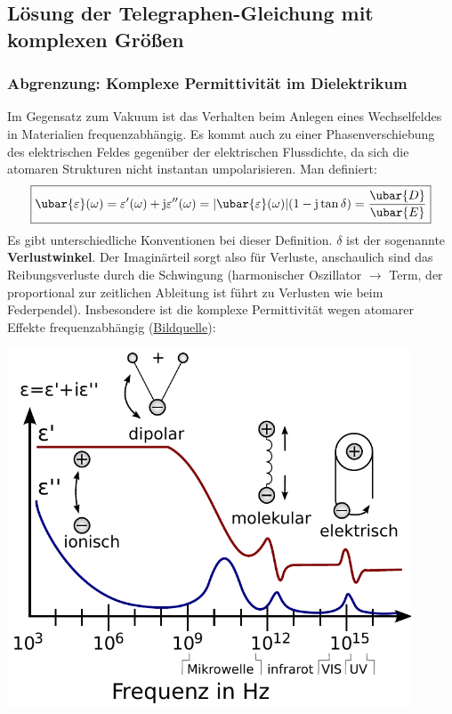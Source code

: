   \subsection{Lösung der Telegraphen-Gleichung mit komplexen Größen}
  \subsubsection{Abgrenzung: Komplexe Permittivität im Dielektrikum}
  Im Gegensatz zum Vakuum ist das Verhalten beim Anlegen eines Wechselfeldes in Materialien frequenzabhängig. Es kommt auch zu einer Phasenverschiebung des elektrischen Feldes gegenüber der elektrischen Flussdichte, da sich die atomaren Strukturen nicht instantan umpolarisieren. Man definiert:
  \begin{equation}\label{komplperm1}
  	\boxed{\ubar{\varepsilon}(\omega)=\varepsilon'(\omega)+\mathrm{j}\varepsilon''(\omega)
  	=|\ubar{\varepsilon}(\omega)|(1-\mathrm{j}\tan\delta)=\frac{\ubar{D}}{\ubar{E}}}
  \end{equation}
 Es gibt unterschiedliche Konventionen bei dieser Definition. $\delta$ ist der sogenannte \textbf{Verlustwinkel}. Der Imaginärteil sorgt also für Verluste, anschaulich sind das Reibungsverluste durch die Schwingung (harmonischer Oszillator $\to$ Term, der proportional zur zeitlichen Ableitung ist führt zu Verlusten wie beim Federpendel). Insbesondere ist die komplexe Permittivität wegen atomarer Effekte frequenzabhängig (\href{https://de.wikipedia.org/wiki/Datei:Dielectric_responses.svg}{Bildquelle}):\\
 \begin{minipage}{0.39\textwidth}
 	\includegraphics[width=0.9\textwidth]{res/Dielectric_responses_DE.pdf}
 \end{minipage}\hfill
